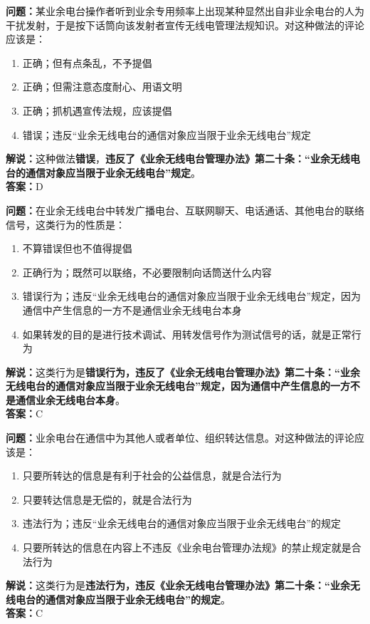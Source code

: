 \documentclass{ctexbook}
\begin{document}
\bigskip


\noindent\textbf{问题：}某业余电台操作者听到业余专用频率上出现某种显然出自非业余电台的人为干扰发射，于是按下话筒向该发射者宣传无线电管理法规知识。对这种做法的评论应该是：
\begin{enumerate}[label=\Alph*), leftmargin=3em]
	\item 正确；但有点条乱，不予提倡
	\item 正确；但需注意态度耐心、用语文明
	\item 正确；抓机遇宣传法规，应该提倡
	\item 错误；违反“业余无线电台的通信对象应当限于业余无线电台”规定
\end{enumerate}
\noindent\textbf{解说：}这种做法\textbf{错误}，\textbf{违反了《业余无线电台管理办法》第二十条：“业余无线电台的通信对象应当限于业余无线电台”规定}。\\\noindent\textbf{答案：}D



\bigskip


\noindent\textbf{问题：}在业余无线电台中转发广播电台、互联网聊天、电话通话、其他电台的联络信号，这类行为的性质是：
\begin{enumerate}[label=\Alph*), leftmargin=3em]
	\item 不算错误但也不值得提倡
	\item 正确行为；既然可以联络，不必要限制向话筒送什么内容
	\item 错误行为；违反“业余无线电台的通信对象应当限于业余无线电台”规定，因为通信中产生信息的一方不是通信业余无线电台本身
	\item 如果转发的目的是进行技术调试、用转发信号作为测试信号的话，就是正常行为
\end{enumerate}
\noindent\textbf{解说：}这类行为是\textbf{错误行为，违反了《业余无线电台管理办法》第二十条：“业余无线电台的通信对象应当限于业余无线电台”规定，因为通信中产生信息的一方不是通信业余无线电台本身}。\\\noindent\textbf{答案：}C


\bigskip


\noindent\textbf{问题：}业余电台在通信中为其他人或者单位、组织转达信息。对这种做法的评论应该是：
\begin{enumerate}[label=\Alph*), leftmargin=3em]
	\item 只要所转达的信息是有利于社会的公益信息，就是合法行为
	\item 只要转达信息是无偿的，就是合法行为
	\item 违法行为；违反“业余无线电台的通信对象应当限于业余无线电台”的规定
	\item 只要所转达的信息在内容上不违反《业余电台管理办法规》的禁止规定就是合法行为
\end{enumerate}
\noindent\textbf{解说：}这类行为是\textbf{违法行为，违反《业余无线电台管理办法》第二十条：“业余无线电台的通信对象应当限于业余无线电台”的规定}。\\\noindent\textbf{答案：}C
\end{document}

